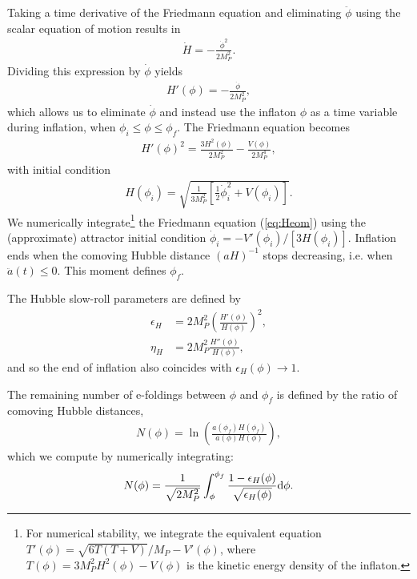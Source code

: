 \documentclass[aps,amsfonts,amsmath,prd,preprint,nofootinbib,superscriptaddress]{revtex4}
\newcommand{\Mp}{{M_{P}}}
\newcommand{\MMp}{{M_P^2}}
\newcommand{\rmd}{{\rm d}}
\begin{document}
Taking a time derivative of the Friedmann equation 
and eliminating $\ddot \phi$ using the scalar equation of motion results in
\begin{align}
\dot H = -\frac{\dot \phi^2}{2\MMp}.
\end{align}
Dividing this expression by $\dot\phi$ yields
\begin{align}\label{eq:phidot}
H'(\phi) = -\frac{\dot \phi}{2\MMp},
\end{align}
which allows us to eliminate $\dot \phi$ and instead use
the inflaton $\phi$ as a time variable during inflation, when $\phi_i \leq \phi \leq \phi_f$.  The Friedmann equation becomes
\begin{align}\label{eq:Heom}
H'(\phi)^2 = \frac{3 H^2(\phi)}{2\MMp} - \frac{V(\phi)}{2 M^4_P},
\end{align}
with initial condition
\begin{align}
H(\phi_i) = \sqrt{\frac{1}{3\MMp}\left[\tfrac{1}{2}\dot \phi_i^2 + V(\phi_i)  \right]}.
\end{align}
We numerically integrate\footnote{For numerical stability, we integrate the equivalent equation $T'(\phi) = \sqrt{6T\left(T+V\right)}/\Mp - V'(\phi)$, where $T(\phi) = 3\MMp H^2(\phi) - V(\phi)$ is the kinetic energy density of the inflaton.}
the Friedmann equation (\ref{eq:Heom}) using the (approximate) attractor initial condition ${\dot \phi_i = -V'(\phi_i)/[3H(\phi_i)]}$.  Inflation ends when the 
comoving Hubble distance $\left(a H\right)^{-1}$ stops decreasing, i.e. when ${\ddot a(t) \leq 0}$.  This moment defines $\phi_f$. 

The Hubble slow-roll parameters are defined by
\begin{align}
\epsilon_H &= 2\MMp \left(\frac{H'(\phi)}{H(\phi)}\right)^2,\\
\eta_H &= 2\MMp \frac{H''(\phi)}{H(\phi)},
\end{align}
and so the end of inflation also coincides with ${\epsilon_H(\phi) \to 1}$.  

The remaining number of e-foldings between $\phi$ and $\phi_f$ is defined by the ratio of comoving Hubble distances, 
\begin{align}
N(\phi) = \ln\left(\frac{a(\phi_f) H(\phi_f)}{a(\phi) H(\phi)}\right),
\end{align}
which we compute by numerically integrating:
\begin{align}
N(\phi) = \frac{1}{\sqrt{2\MMp}}\int_{\phi}^{\phi_f} \frac{1-\epsilon_H(\phi)}{\sqrt{\epsilon_H(\phi)}}\rmd \phi .
\end{align}
\end{document}
